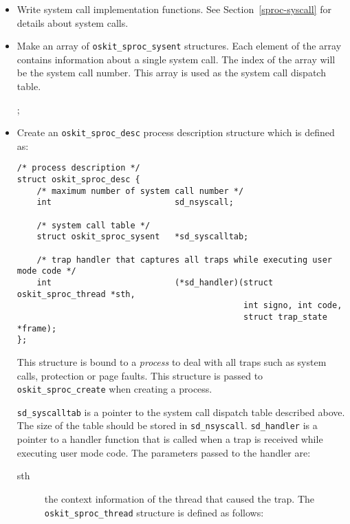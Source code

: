 \begin{itemize}
        \item Write system call implementation functions.  See
        Section~\ref{sproc-syscall} for details about system calls.

        \item Make an array of \texttt{oskit_sproc_sysent} structures.
        Each element of the array contains information about a single
        system call.  The index of the array will be the system call
        number.  This array is used as the system call dispatch table.

        ;

        \item Create an \texttt{oskit_sproc_desc} process description
	structure which is defined as:

\begin{verbatim}
/* process description */
struct oskit_sproc_desc {
    /* maximum number of system call number */
    int                         sd_nsyscall;

    /* system call table */
    struct oskit_sproc_sysent   *sd_syscalltab;

    /* trap handler that captures all traps while executing user mode code */
    int                         (*sd_handler)(struct oskit_sproc_thread *sth,
                                              int signo, int code,
                                              struct trap_state *frame);
};
\end{verbatim}

        This structure is bound to a \emph{process} to deal with all traps
        such as system calls, protection or page faults.  This 
        structure is passed to \texttt{oskit_sproc_create} when
        creating a process.

        \texttt{sd_syscalltab} is a pointer to the system
        call dispatch table described above.  The size of the table
        should be stored in \texttt{sd_nsyscall}.  \texttt{sd_handler}
        is a pointer to a handler function that is called when a trap
        is received while executing user mode code.  The parameters
        passed to the handler are:
        \begin{description}
        \item[sth] the context information of the thread that caused
          the trap.  The \texttt{oskit_sproc_thread} structure is defined
          as follows:


\end{description}
\end{itemize}
